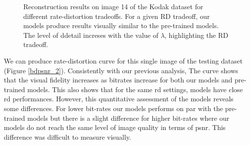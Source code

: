 \begin{figure}[H]
    \centering
    \caption[Reconstruction results on image 14 of the Kodak dataset for different rate-distortion tradeoffs.]{Reconstruction results on image 14 of the Kodak dataset for different rate-distortion tradeoffs. For a given \acrshort{RD} tradeoff, our models produce results visually similar to the pre-trained models. The level of ddetail increses with the value of \(\lambda\), highlighting the \acrshort{RD} tradeoff.}
    \label{bdpsnr_1}
\end{figure}

We can produce rate-distortion curve for this single image of the testing dataset (Figure \ref{bdpsnr_2}). Consistently with our previous analysis, The curve shows that the visual fidelity increases as bitrates increase for both our models and pre-trained models. This also shows that for the same \acrshort{rd} settings, models have close \acrshort{rd} performances. However, this quantitative assessment of the models reveals some differences. For lower bit-rates our models performs on par with the pre-trained models but there is a slight difference for higher bit-rates where our models do not reach the same level of image quality in terms of \acrshort{psnr}. This difference was difficult to measure visually.

